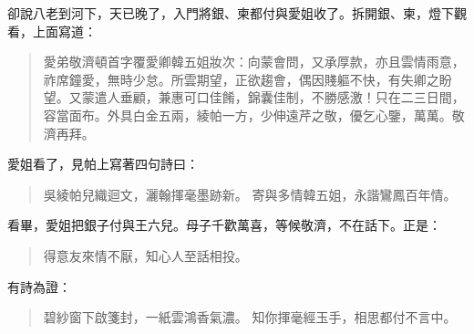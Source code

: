 卻說八老到河下，天已晚了，入門將銀、柬都付與愛姐收了。拆開銀、柬，燈下觀看，上面寫道：
\begin{quote}
愛弟敬濟頓首字覆愛卿韓五姐妝次：向蒙會問，又承厚款，亦且雲情雨意，祚席鐘愛，無時少怠。所雲期望，正欲趨會，偶因賤軀不快，有失卿之盼望。又蒙遣人垂顧，兼惠可口佳餚，錦囊佳制，不勝感激！只在二三日間，容當面布。外具白金五兩，綾帕一方，少伸遠芹之敬，優乞心鑒，萬萬。敬濟再拜。
\end{quote}

愛姐看了，見帕上寫著四句詩曰：
\begin{quote}
吳綾帕兒織迴文，灑翰揮毫墨跡新。
寄與多情韓五姐，永諧鸞鳳百年情。
\end{quote}

看畢，愛姐把銀子付與王六兒。母子千歡萬喜，等候敬濟，不在話下。正是：
\begin{quote}
得意友來情不厭，知心人至話相投。
\end{quote}
有詩為證：
\begin{quote}
碧紗窗下啟箋封，一紙雲鴻香氣濃。
知你揮毫經玉手，相思都付不言中。
\end{quote}
